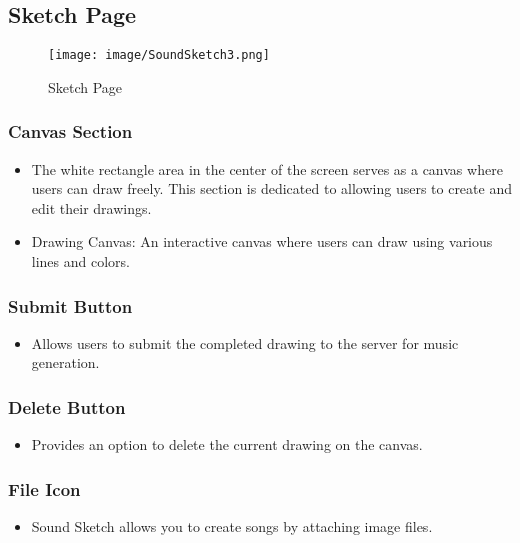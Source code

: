 \documentclass[conference]{IEEEtran}
\begin{document}
\subsection{Sketch Page }

\begin{figure}[h!]
    \centering
    \texttt{[image: image/SoundSketch3.png]}
    \caption{Sketch Page}
    \label{fig:enter-label}
\end{figure}

\subsubsection{Canvas Section}
\begin{itemize}
    \item The white rectangle area in the center of the screen serves as a canvas where users can draw freely. This section is dedicated to allowing users to create and edit their drawings.\\
    \item Drawing Canvas: An interactive canvas where users can draw using various lines and colors.\\
\end{itemize}

\subsubsection{Submit Button}
\begin{itemize}
    \item Allows users to submit the completed drawing to the server for music generation.\\
\end{itemize}

\subsubsection{Delete Button}
\begin{itemize}
    \item Provides an option to delete the current drawing on the canvas.\\
\end{itemize}

\subsubsection{File Icon}
\begin{itemize}
    \item Sound Sketch allows you to create songs by attaching image files.\\
\end{itemize}
\end{document}
